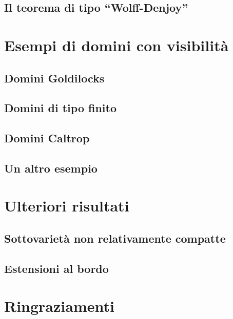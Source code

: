 \documentclass{article}
\begin{document}
\subsection{Il teorema di tipo ``Wolff-Denjoy''}


\newpage

\section{Esempi di domini con visibilità} \label{Esempi di domini con visibilità}

\subsection{Domini Goldilocks}

\subsection{Domini di tipo finito}

\subsection{Domini Caltrop}

\subsection{Un altro esempio}


\newpage

\section{Ulteriori risultati} \label{Ulteriori risultati}
\subsection{Sottovarietà non relativamente compatte}

\subsection{Estensioni al bordo}


\newpage



\newpage

\section*{Ringraziamenti}

\end{document}
